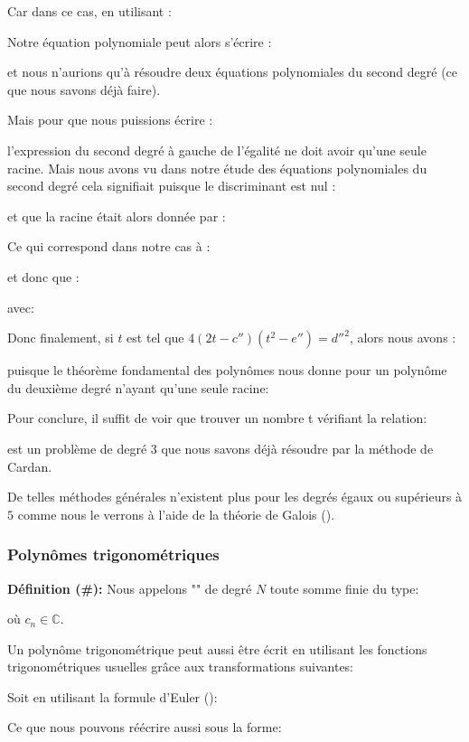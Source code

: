 	Car dans ce cas, en utilisant :
	
	Notre équation polynomiale peut alors s'écrire :
	
	et nous n'aurions qu'à résoudre deux équations polynomiales du second degré (ce que nous savons déjà faire).
	
	Mais pour que nous puissions écrire :
	
	l'expression du second degré à gauche de l'égalité ne doit avoir qu'une seule racine. Mais nous avons vu dans notre étude des équations polynomiales du second degré cela signifiait puisque le discriminant est nul :
	
	et que la racine était alors donnée par :
	
	Ce qui correspond dans notre cas à :
	
	et donc que :
	
	avec:
	
	Donc finalement, si $t$ est tel que $4(2t-c'')(t^2-e'')={d''}^2$, alors nous avons :
	
	puisque le théorème fondamental des polynômes nous donne pour un polynôme du deuxième degré n'ayant qu'une seule racine:
	
	Pour conclure, il suffit de voir que trouver un nombre t vérifiant la relation:
	
	est un problème de degré $3$ que nous savons déjà résoudre par la méthode de Cardan.
	
	De telles méthodes générales n'existent plus pour les degrés égaux ou supérieurs à $5$ comme nous le verrons à l'aide de la théorie de Galois ().
	
	\subsubsection{Polynômes trigonométriques}\label{trigonometric polynomials}
	\textbf{Définition (\#\mydef):} Nous appelons "" de degré $N$ toute somme finie du type:
	
	où $c_n\in \mathbb{C}$.

	Un polynôme trigonométrique peut aussi être écrit en utilisant les fonctions trigonométriques usuelles grâce aux transformations suivantes:
	
	Soit en utilisant la formule d'Euler ():
	
	Ce que nous pouvons réécrire aussi sous la forme:
	
